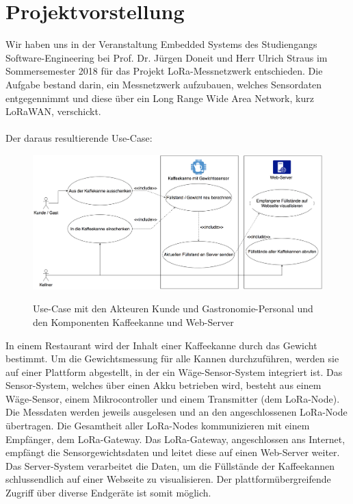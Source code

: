 

\chapter{Projektvorstellung}
Wir haben uns in der Veranstaltung Embedded Systems des Studiengangs Software-Engineering bei Prof. Dr. Jürgen Doneit und Herr Ulrich Straus im Sommersemester 2018 für das Projekt LoRa-Messnetzwerk entschieden. Die Aufgabe bestand darin, ein Messnetzwerk aufzubauen, welches Sensordaten entgegennimmt und diese über ein Long Range Wide Area Network, kurz LoRaWAN, verschickt.\\
\\
Der daraus resultierende Use-Case:
\begin{figure}[H]
    \center
    \includegraphics[width=15cm]{Bilder/usecase-1.png}\\
    \caption{Use-Case mit den Akteuren Kunde und Gastronomie-Personal und den Komponenten Kaffeekanne und Web-Server}
    \label{fig:Use-Case}
\end{figure}
\noindent
In einem Restaurant wird der Inhalt einer Kaffeekanne durch das Gewicht bestimmt. Um die Gewichtsmessung für alle Kannen durchzuführen, werden sie auf einer Plattform abgestellt, in der ein Wäge-Sensor-System integriert ist. Das Sensor-System, welches über einen Akku betrieben wird, besteht aus einem Wäge-Sensor, einem Mikrocontroller und einem Transmitter (dem LoRa-Node). Die Messdaten werden jeweils ausgelesen und an den angeschlossenen LoRa-Node übertragen. Die Gesamtheit aller LoRa-Nodes kommunizieren mit einem Empfänger, dem LoRa-Gateway. Das LoRa-Gateway, angeschlossen ans Internet, empfängt die Sensorgewichtsdaten und leitet diese auf einen Web-Server weiter. Das Server-System verarbeitet die Daten, um die Füllstände der Kaffeekannen schlussendlich auf einer Webseite zu visualisieren. Der plattformübergreifende Zugriff über diverse Endgeräte ist somit möglich.

